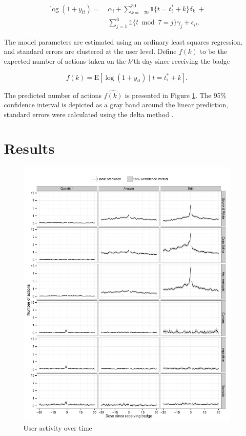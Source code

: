 \documentclass[conference]{IEEEtran}
\newcommand{\1}{\mathds{1}}
\newcommand{\E}{\mathrm{E}}
\begin{document}
\begin{equation}
\begin{split}
\log(1 + y_{it}) = \; & \alpha_i + \sum_{k=-29}^{30} \1 \{ t = t_i^* + k \} \delta_k \; + \\
  & \sum_{j=1}^6 \1 \{ t \bmod 7 = j \} \gamma_j + \epsilon_{it}.
\end{split}
\end{equation}

The model parameters are estimated using an ordinary least squares regression, and standard errors are clustered at the user level. Define $f(k)$ to be the expected number of actions taken on the $k$'th day since receiving the badge

\begin{equation}
f(k) = \E \left[ \log(1 + y_{it}) \; | \; t=t^*_i + k \right].
\end{equation}

The predicted number of actions $\hat{f(k)}$ is presented in Figure \ref{fig:badges}. The 95\% confidence interval is depicted as a gray band around the linear prediction, standard errors were calculated using the delta method \citep{Williams2012}.

\section{Results}

\begin{figure}
  \centering
  \includegraphics[width=\textwidth]{../figures/badges.pdf}
  \caption{User activity over time \label{fig:badges}}
\end{figure}
\end{document}
